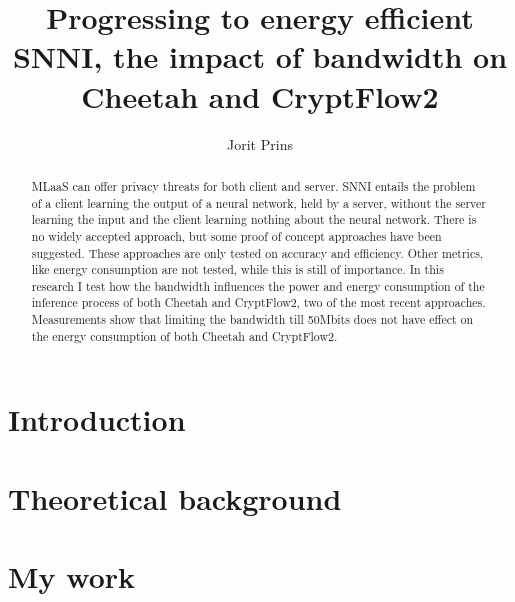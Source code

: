\documentclass[twoside]{Style/uva-inf-bachelor-thesis}
\title{Progressing to energy efficient SNNI, the impact of bandwidth on Cheetah and CryptFlow2}
\author{Jorit Prins}
\begin{document}
\maketitle

\begin{abstract}
MLaaS can offer privacy threats for both client and server. SNNI entails the problem of a client learning the output of a neural network, held by a server, without the server learning the input and the client learning nothing about the neural network. There is no widely accepted approach, but some proof of concept approaches have been suggested. These approaches are only tested on accuracy and efficiency. Other metrics, like energy consumption are not tested, while this is still of importance. In this research I test how the bandwidth influences the power and energy consumption of the inference process of both Cheetah and CryptFlow2, two of the most recent approaches. Measurements show that limiting the bandwidth till 50Mbits does not have effect on the energy consumption of both Cheetah and CryptFlow2.

\end{abstract}

\tableofcontents

\chapter{Introduction}\label{chap:introduction}


\chapter{Theoretical background}\label{chap:theoreticalbackground}


\chapter{My work}\label{chap:mywork}

\end{document}
